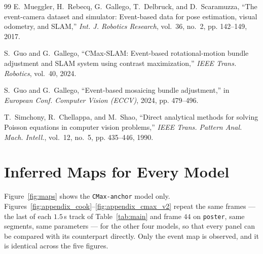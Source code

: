 \documentclass[journal]{IEEEtran}
\begin{document}
\begin{thebibliography}{99}
E.~Mueggler, H.~Rebecq, G.~Gallego, T.~Delbruck, and D.~Scaramuzza, ``The
event-camera dataset and simulator: Event-based data for pose estimation, visual
odometry, and SLAM,'' \emph{Int. J. Robotics Research}, vol.~36, no.~2, pp.
142--149, 2017.

S.~Guo and G.~Gallego, ``CMax-SLAM: Event-based rotational-motion bundle
adjustment and SLAM system using contrast maximization,'' \emph{IEEE Trans.
Robotics}, vol.~40, 2024.

S.~Guo and G.~Gallego, ``Event-based mosaicing bundle adjustment,'' in
\emph{European Conf. Computer Vision (ECCV)}, 2024, pp. 479--496.

T.~Simchony, R.~Chellappa, and M.~Shao, ``Direct analytical methods for solving
Poisson equations in computer vision problems,'' \emph{IEEE Trans. Pattern Anal.
Mach. Intell.}, vol.~12, no.~5, pp. 435--446, 1990.

\end{thebibliography}


\appendices
\section{Inferred Maps for Every Model}
\label{app:maps}

Figure~\ref{fig:maps} shows the \texttt{CMax-anchor} model only.
Figures~\ref{fig:appendix_cook}--\ref{fig:appendix_cmax_v2} repeat the same
frames --- the last of each $1.5$\,s track of Table~\ref{tab:main} and frame
$44$ on \texttt{poster}, same segments, same parameters --- for the other four
models, so that every panel can be compared with its counterpart directly. Only
the event map is observed, and it is identical across the five figures.
\end{document}
